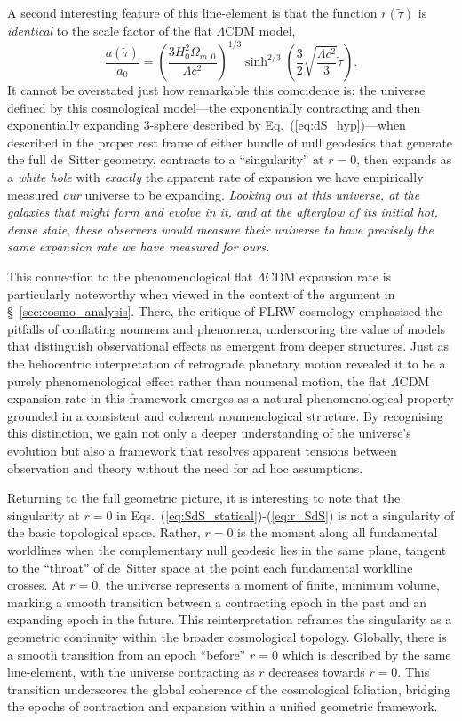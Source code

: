 \documentclass[aps,rmp,groupedaddress,twocolumn,10pt]{revtex4-2}
\begin{document}
A second interesting feature of this line-element is that the function $r(\tilde{\tau})$ is \textit{identical} to the scale factor of the flat $\Lambda$CDM model, 
\begin{equation} 
    \frac{a(\tilde{\tau})}{a_0}=\left(\frac{3H_0^2\Omega_{m,0}}{\Lambda c^2}\right)^{1/3}\sinh^{2/3}\left(\frac{3}{2}\sqrt{\frac{\Lambda c^2}{3}}\tilde{\tau}\right).\label{eq:scalefac} 
\end{equation} 
It cannot be overstated just how remarkable this coincidence is: the universe defined by this cosmological model---the exponentially contracting and then exponentially expanding 3-sphere described by Eq.~(\ref{eq:dS_hyp})---when described in the proper rest frame of either bundle of null geodesics that generate the full de~Sitter geometry, contracts to a ``singularity'' at $r=0$, then expands as a \textit{white hole} with \textit{exactly} the apparent rate of expansion we have empirically measured \textit{our} universe to be expanding. \textit{Looking out at this universe, at the galaxies that might form and evolve in it, and at the afterglow of its initial hot, dense state, these observers would measure their universe to have precisely the same expansion rate we have measured for ours.}

This connection to the phenomenological flat $\Lambda$CDM expansion rate is particularly noteworthy when viewed in the context of the argument in \S~\ref{sec:cosmo_analysis}. There, the critique of FLRW cosmology emphasised the pitfalls of conflating noumena and phenomena, underscoring the value of models that distinguish observational effects as emergent from deeper structures. Just as the heliocentric interpretation of retrograde planetary motion revealed it to be a purely phenomenological effect rather than noumenal motion, the flat $\Lambda$CDM expansion rate in this framework emerges as a natural phenomenological property grounded in a consistent and coherent noumenological structure. By recognising this distinction, we gain not only a deeper understanding of the universe's evolution but also a framework that resolves apparent tensions between observation and theory without the need for ad hoc assumptions.

Returning to the full geometric picture, it is interesting to note that the singularity at $r=0$ in Eqs.~(\ref{eq:SdS_statical})-(\ref{eq:r_SdS}) is not a singularity of the basic topological space. Rather, $r=0$ is the moment along all fundamental worldlines when the complementary null geodesic lies in the same plane, tangent to the ``throat'' of de~Sitter space at the point each fundamental worldline crosses. At $r=0$, the universe represents a moment of finite, minimum volume, marking a smooth transition between a contracting epoch in the past and an expanding epoch in the future. This reinterpretation reframes the singularity as a geometric continuity within the broader cosmological topology. Globally, there is a smooth transition from an epoch ``before'' $r=0$ which is described by the same line-element, with the universe contracting as $r$ decreases towards $r=0$. This transition underscores the global coherence of the cosmological foliation, bridging the epochs of contraction and expansion within a unified geometric framework.
\end{document}
